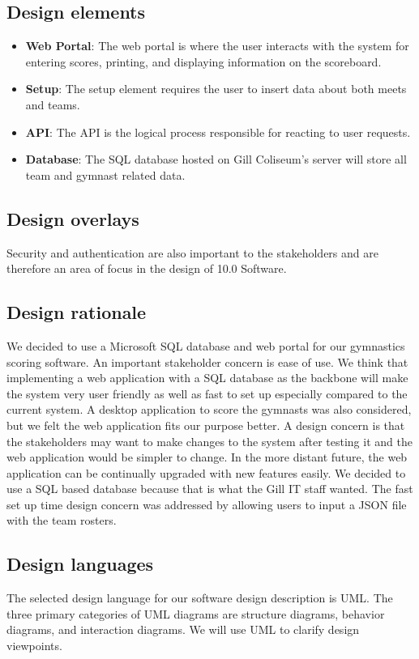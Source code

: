 \documentclass[letterpaper,10pt,draftclsnofoot,onecolumn,]{article}
\begin{document}
\subsection{Design elements}
\begin{itemize}
    \item \textbf{Web Portal}: The web portal is where the user interacts with the system for entering scores, printing, and displaying information on the scoreboard.
    \item \textbf{Setup}: The setup element requires the user to insert data about both meets and teams.
    \item \textbf{API}: The API is the logical process responsible for reacting to user requests.
    \item \textbf{Database}: The SQL database hosted on Gill Coliseum's server will store all team and gymnast related data.
\end{itemize}
\subsection{Design overlays}
Security and authentication are also important to the stakeholders and are therefore an area of focus in the design of 10.0 Software.
\subsection{Design rationale}
We decided to use a Microsoft SQL database and web portal for our gymnastics scoring software. An important stakeholder concern is ease of use. We think that implementing a web application with a SQL database as the backbone will make the system very user friendly as well as fast to set up especially compared to the current system. A desktop application to score the gymnasts was also considered, but we felt the web application fits our purpose better. A design concern is that the stakeholders may want to make changes to the system after testing it and the web application would be simpler to change. In the more distant future, the web application can be continually upgraded with new features easily. We decided to use a SQL based database because that is what the Gill IT staff wanted. The fast set up time design concern was addressed by allowing users to input a JSON file with the team rosters.
\subsection{Design languages}
The selected design language for our software design description is UML. The three primary categories of UML diagrams are structure diagrams, behavior diagrams, and interaction diagrams. We will use UML to clarify design viewpoints. 
\end{document}

